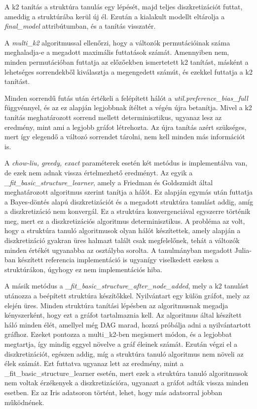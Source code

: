 A k2 tanítás a struktúra tanulás egy lépését, majd teljes diszkretizációt futtat, ameddig a struktúrába kerül új él. Ezután a kialakult modellt eltárolja a \emph{final\_model} attribútumban, és a tanítás visszatér.

A \emph{multi\_k2} algoritmussal ellenőrzi, hogy a változók permutációinak száma meghaladja-e a megadott maximális futtatások számát. Amennyiben nem, minden permutációban futtatja az előzőekben ismertetett k2 tanítást, másként a lehetséges sorrendekből kiválasztja a megengedett számút, és ezekkel futtatja a k2 tanítást.

Minden sorrendű futás után értékeli a felépített hálót a \emph{util.preference\_bias\_full} függvénnyel, és az ez alapján legjobbnak ítéltet a végén újra betanítja. Mivel a k2 tanítás meghatározott sorrend mellett determinisztikus, ugyanaz lesz az eredmény, mint ami a legjobb gráfot létrehozta. Az újra tanítás azért szükséges, mert így elegendő a változó sorrendet tárolni, nem kell minden más információt is.

A \emph{chow-liu, greedy, exact} paraméterek esetén két metódus is implementálva van, de ezek nem adnak vissza értelmezhető eredményt. Az egyik a \emph{\_fit\_basic\_structure\_learner}, amely a Friedman és Goldszmidt \cite{friedman1996discretizing} által meghatározott algoritmus szerint tanítja a hálót. Ez alapján egymás után futtatja a Bayes-döntés alapú diszkretizációt és a megadott struktúra tanulást addig, amíg a diszkretizáció nem konvergál. Ez a struktúra konvergenciával egyszerre történik meg, mert ez a diszkretizációs algoritmus determinisztikus. A probléma az volt, hogy a struktúra tanuló algoritmusok olyan hálót készítettek, amely alapján a diszkretizáció gyakran üres halmazt talált csak megfelelőnek, tehát a változók minden értékét ugyanabba az osztályba sorolta. A tanulmányban megadott Julia-ban készített referencia implementáció is ugyanígy viselkedett ezeken a struktúrákon, úgyhogy ez nem implementációs hiba.

A másik metódus a \emph{\_fit\_basic\_structure\_after\_node\_added}, mely a k2 tanulást utánozza a beépített struktúra készítőkkel. Nyilvántart egy külön gráfot, mely az elején üres. Minden struktúra tanítási lépésben az algoritmusnak megadja kényszerként, hogy ezt a gráfot tartalmaznia kell. Az algoritmus által készített háló minden élét, amellyel még DAG marad, hozzá próbálja adni a nyilvántartott gráfhoz. Ezeket pontozza a multi\_k2-ben megismert módon, és a legjobbat megtartja, így mindig eggyel növelve a gráf éleinek számát. Ezután végzi el a diszkretizációt, egészen addig, míg a struktúra tanuló algoritmus nem növeli az élek számát. Ezt futtatva ugyanaz lett az eredmény, mint a \_fit\_basic\_structure\_learner esetén, mert ezek a struktúra tanuló algoritmusok nem voltak érzékenyek a diszkretizációra, ugyanazt a gráfot adták vissza minden esetben. Ez az Iris adatsoron történt, lehet, hogy más adatsorral jobban működnének.

